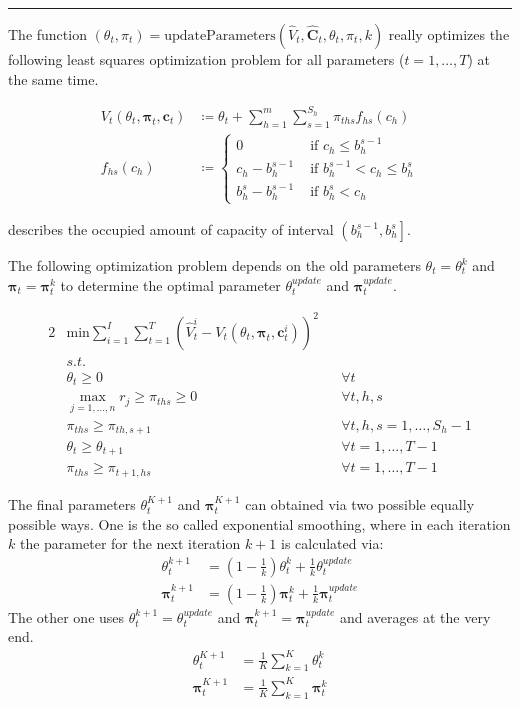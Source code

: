 \noindent\rule{\textwidth}{1pt}
The function $\left(\theta_t, \pi_t \right) = \text{updateParameters}\left(\hat{V}_t, \mathbf{\hat{C}}_t, \theta_t, \pi_t, k\right)$ really optimizes the following least squares optimization problem for all parameters ($t = 1, \dots, T$) at the same time.

\begin{align}
V_t(\theta_t, \mathbf{\pi}_t, \mathbf{c}_t) & \coloneqq \theta_t + \sum_{h=1}^{m}\sum_{s=1}^{S_h} \pi_{ths} f_{hs}(c_h) \\
f_{hs}(c_h) &\coloneqq 
\begin{cases}\label{def-f}
0 & \text{ if } c_h \leq b_h^{s-1}\\
c_h - b_h^{s-1} & \text{ if } b_h^{s-1} < c_h \leq b_h^s \\
b_h^s - b_h^{s-1} & \text{ if } b_h^s < c_h
\end{cases}
\end{align}

 describes the occupied amount of capacity of interval $\left(b_h^{s-1}, b_h^s\right]$.

The following optimization problem depends on the old parameters $\theta_t = \theta_t^k$ and $\mathbf{\pi}_t = \mathbf{\pi}_t^k$ to determine the optimal parameter $\theta_t^{update}$ and $\mathbf{\pi}_t^{update}$.

\begin{alignat}{2}
& \text{min} \sum_{i=1}^{I}\sum_{t=1}^{T} \left( \hat{V}_t^i - V_t(\theta_t, \mathbf{\pi}_t, \mathbf{c}_t^i) \right)^2 && \\
& s.t. && \\
& \theta_t \geq 0 && \forall t\\
& \max_{j=1, \dots, n} r_j \geq \pi_{ths} \geq 0 && \forall t, h, s\\
& \pi_{ths} \geq \pi_{th,s+1} && \forall t, h, s = 1, \dots, S_h-1\\
& \theta_t \geq \theta_{t+1} && \forall t = 1, \dots, T-1\\
& \pi_{ths} \geq \pi_{t+1,hs} && \forall t = 1, \dots, T-1
\end{alignat}

The final parameters $\theta_t^{K+1}$ and $\mathbf{\pi}_t^{K+1}$ can obtained via two possible equally possible ways. One is the so called exponential smoothing, where in each iteration $k$ the parameter for the next iteration $k+1$ is calculated via:
\begin{align}
\theta_t^{k+1} &= \left(1- \frac{1}{k} \right)	\theta_t^k + \frac{1}{k} \theta_t^{update}\\
\mathbf{\pi}_t^{k+1} &= \left(1- \frac{1}{k} \right)	\mathbf{\pi}_t^k + \frac{1}{k} \mathbf{\pi}_t^{update}
\end{align}
The other one uses $\theta_t^{k+1} = \theta_t^{update}$ and $\mathbf{\pi}_t^{k+1} = \mathbf{\pi}_t^{update}$ and averages at the very end.
\begin{align}
\theta_t^{K+1} &= \frac{1}{K}\sum_{k=1}^{K}\theta_t^k\\
\mathbf{\pi}_t^{K+1} &= \frac{1}{K}\sum_{k=1}^{K}\mathbf{\pi}_t^k
\end{align}

